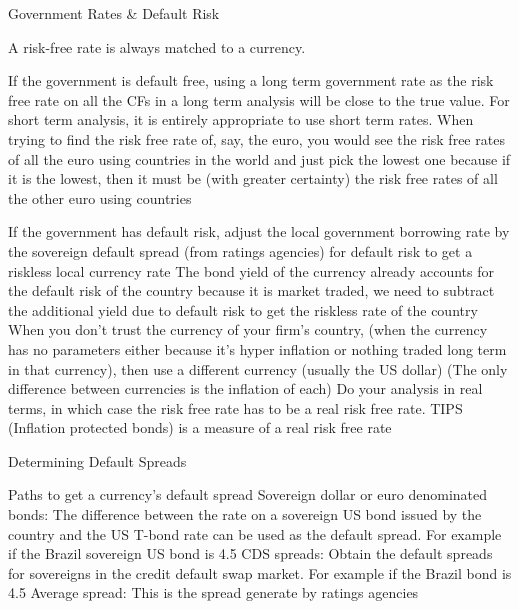 \documentclass[10pt]{article}
\begin{document}
    \begin{core}{Government Rates \& Default Risk}

      A risk-free rate is always matched to a currency.

      If the government is default free, using a long term government rate as the risk free rate on all the CFs in a long term analysis will be close to the true value. For short term analysis, it is entirely appropriate to use short term rates.
      When trying to find the risk free rate of, say, the euro, you would see the risk free rates of all the euro using countries in the world and just pick the lowest one because if it is the lowest, then it must be (with greater certainty) the risk free rates of all the other euro using countries

      If the government has default risk, adjust the local government borrowing rate by the sovereign default spread (from ratings agencies) for default risk to get a riskless local currency rate
      The bond yield of the currency already accounts for the default risk of the country because it is market traded, we need to subtract the additional yield due to default risk to get the riskless rate of the country
      When you don’t trust the currency of your firm’s country, (when the currency has no parameters either because it’s hyper inflation or nothing traded long term in that currency), then use a different currency (usually the US dollar)
      (The only difference between currencies is the inflation of each) Do your analysis in real terms, in which case the risk free rate has to be a real risk free rate. TIPS (Inflation protected bonds) is a measure of a real risk free rate

    \end{core}

    \begin{core}{Determining Default Spreads}

      Paths to get a currency’s default spread
      Sovereign dollar or euro denominated bonds: The difference between the rate on a sovereign US bond issued by the country and the US T-bond rate can be used as the default spread.
      For example if the Brazil sovereign US bond is 4.5%
      CDS spreads: Obtain the default spreads for sovereigns in the credit default swap market.
      For example if the Brazil bond is 4.5%
      Average spread: This is the spread generate by ratings agencies

    \end{core}
\end{document}
